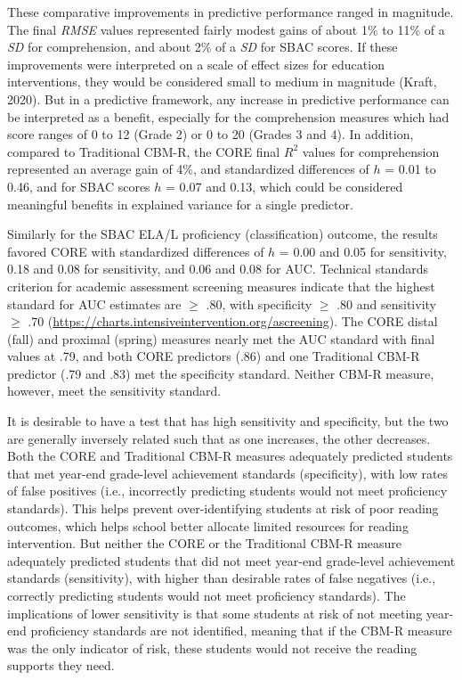 \documentclass[
  english,
  man, fleqn, noextraspace]{apa6}
\begin{document}
These comparative improvements in predictive performance ranged in magnitude. The final \emph{RMSE} values represented fairly modest gains of about 1\% to 11\% of a \emph{SD} for comprehension, and about 2\% of a \emph{SD} for SBAC scores. If these improvements were interpreted on a scale of effect sizes for education interventions, they would be considered small to medium in magnitude (Kraft, 2020). But in a predictive framework, any increase in predictive performance can be interpreted as a benefit, especially for the comprehension measures which had score ranges of 0 to 12 (Grade 2) or 0 to 20 (Grades 3 and 4). In addition, compared to Traditional CBM-R, the CORE final \(R^2\) values for comprehension represented an average gain of 4\%, and standardized differences of \(h\) = 0.01 to 0.46, and for SBAC scores \(h\) = 0.07 and 0.13, which could be considered meaningful benefits in explained variance for a single predictor.

Similarly for the SBAC ELA/L proficiency (classification) outcome, the results favored CORE with standardized differences of \(h\) = 0.00 and 0.05 for sensitivity, 0.18 and 0.08 for sensitivity, and 0.06 and 0.08 for AUC. Technical standards criterion for academic assessment screening measures indicate that the highest standard for AUC estimates are \(\geq\) .80, with specificity \(\geq\) .80 and sensitivity \(\geq\) .70 (\url{https://charts.intensiveintervention.org/ascreening}). The CORE distal (fall) and proximal (spring) measures nearly met the AUC standard with final values at .79, and both CORE predictors (.86) and one Traditional CBM-R predictor (.79 and .83) met the specificity standard. Neither CBM-R measure, however, meet the sensitivity standard.

It is desirable to have a test that has high sensitivity and specificity, but the two are generally inversely related such that as one increases, the other decreases. Both the CORE and Traditional CBM-R measures adequately predicted students that met year-end grade-level achievement standards (specificity), with low rates of false positives (i.e., incorrectly predicting students would not meet proficiency standards). This helps prevent over-identifying students at risk of poor reading outcomes, which helps school better allocate limited resources for reading intervention. But neither the CORE or the Traditional CBM-R measure adequately predicted students that did not meet year-end grade-level achievement standards (sensitivity), with higher than desirable rates of false negatives (i.e., correctly predicting students would not meet proficiency standards). The implications of lower sensitivity is that some students at risk of not meeting year-end proficiency standards are not identified, meaning that if the CBM-R measure was the only indicator of risk, these students would not receive the reading supports they need.
\end{document}
